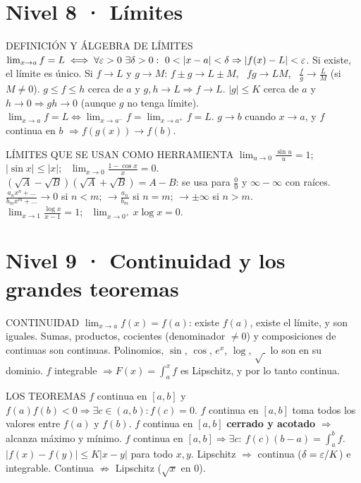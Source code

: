 \section*{Nivel 8 · Límites}
\begin{sello}{DEFINICIÓN Y ÁLGEBRA DE LÍMITES}
 $\lim_{x\to a}f=L\iff\forall\eps>0\ \exists\delta>0:\ 0<|x-a|<\delta\Rightarrow|f(x)-L|<\eps$.
 Si existe, el límite es único.
 Si $f\to L$ y $g\to M$: $f\pm g\to L\pm M$, \ $fg\to LM$, \ $\frac fg\to\frac LM$ (si $M\neq0$).
 $g\le f\le h$ cerca de $a$ y $g,h\to L\Rightarrow f\to L$.
 $|g|\le K$ cerca de $a$ y $h\to0\Rightarrow gh\to0$ (aunque $g$ no tenga límite).
 $\lim_{x\to a}f=L\iff\lim_{x\to a^-}f=\lim_{x\to a^+}f=L$.
 $g\to b$ cuando $x\to a$, y $f$ continua en $b$ $\Rightarrow f(g(x))\to f(b)$.
\end{sello}
\begin{memo}{LÍMITES QUE SE USAN COMO HERRAMIENTA}
 $\lim_{u\to0}\frac{\sin u}u=1$; \ $|\sin x|\le|x|$; \ $\lim_{x\to0}\frac{1-\cos x}x=0$.\\
 $(\sqrt A-\sqrt B)(\sqrt A+\sqrt B)=A-B$: se usa para $\frac00$ y $\infty-\infty$ con raíces.\\
 $\frac{a_nx^n+\dots}{b_mx^m+\dots}\to0$ si $n<m$; $\to\frac{a_n}{b_m}$ si $n=m$; $\to\pm\infty$ si $n>m$.\\
 $\lim_{x\to1}\frac{\log x}{x-1}=1$; \ $\lim_{x\to0^+}x\log x=0$.
\end{memo}

\section*{Nivel 9 · Continuidad y los grandes teoremas}
\begin{sello}{CONTINUIDAD}
 $\lim_{x\to a}f(x)=f(a)$: existe $f(a)$, existe el límite, y son iguales.
 Sumas, productos, cocientes (denominador $\neq0$) y composiciones de continuas son continuas. Polinomios, $\sin$, $\cos$, $e^x$, $\log$, $\sqrt{\ }$ lo son en su dominio.
 $f$ integrable $\Rightarrow F(x)=\int_a^xf$ es Lipschitz, y por lo tanto continua.
\end{sello}
\begin{sello}{LOS TEOREMAS}
 $f$ continua en $[a,b]$ y $f(a)f(b)<0\Rightarrow\exists c\in(a,b):f(c)=0$.
 $f$ continua en $[a,b]$ toma todos los valores entre $f(a)$ y $f(b)$.
 $f$ continua en $[a,b]$ \textbf{cerrado y acotado} $\Rightarrow$ alcanza máximo y mínimo.
 $f$ continua en $[a,b]\Rightarrow\exists c:\ f(c)(b-a)=\int_a^bf$.
 $|f(x)-f(y)|\le K|x-y|$ para todo $x,y$. Lipschitz $\Rightarrow$ continua ($\delta=\varepsilon/K$) e integrable. Continua $\not\Rightarrow$ Lipschitz ($\sqrt x$ en 0).
\end{sello}

